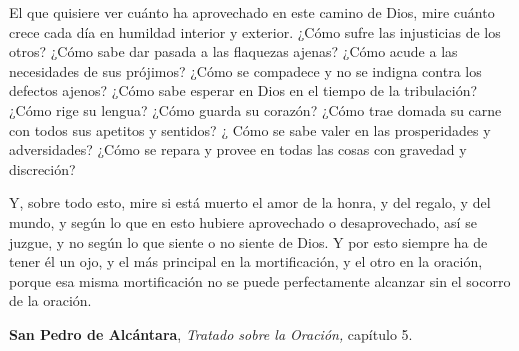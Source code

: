 El que quisiere ver cuánto ha aprovechado en este camino de Dios, mire cuánto crece cada día en humildad interior y exterior. ¿Cómo sufre las injusticias de los otros? ¿Cómo sabe dar pasada a las flaquezas ajenas? ¿Cómo acude a las necesidades de sus prójimos? ¿Cómo se compadece y no se indigna contra los defectos ajenos? ¿Cómo sabe esperar en Dios en el tiempo de la tribulación? ¿Cómo rige su lengua? ¿Cómo guarda su corazón? ¿Cómo trae domada su carne con todos sus apetitos y sentidos? ¿ Cómo se sabe valer en las prosperidades y adversidades? ¿Cómo se repara y provee en todas las cosas con gravedad y discreción?

Y, sobre todo esto, mire si está muerto el amor de la honra, y del regalo, y del mundo, y según lo que en esto hubiere aprovechado o desaprovechado, así se juzgue, y no según lo que siente o no siente de Dios. Y por esto siempre ha de tener él un ojo, y el más principal en la mortificación, y el otro en la oración, porque esa misma mortificación no se puede perfectamente alcanzar sin el socorro de la oración.

\textbf{San Pedro de Alcántara}, \emph{Tratado sobre la Oración,} capítulo 5.\strut



